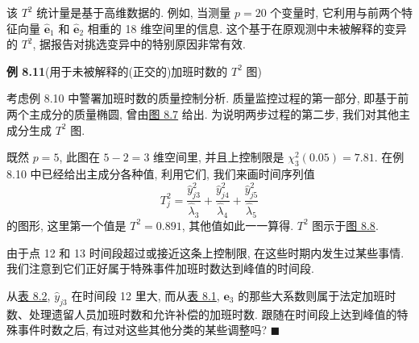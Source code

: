 该 $T^2$ 统计量是基于高维数据的. 例如, 当测量 $p=20$ 个变量时, 它利用与前两个特征向量 $\hat{\mathbf{e}}_1$ 和 $\hat{\mathbf{e}}_2$ 相重的 18 维空间里的信息. 这个基于在原观测中未被解释的变异的 $T^2$, 据报告对挑选变异中的特别原因非常有效.

\noindent\textbf{例 8.11}\quad (用于未被解释的(正交的)加班时数的 $T^2$ 图)

考虑例 8.10 中警署加班时数的质量控制分析. 质量监控过程的第一部分, 即基于前两个主成分的质量椭圆, 曾由\hyperref[fig:8.7]{图 8.7} 给出. 为说明两步过程的第二步, 我们对其他主成分生成 $T^2$ 图.

既然 $p=5$, 此图在 $5-2=3$ 维空间里, 并且上控制限是 $\chi_3^2(0.05)=7.81$. 在例 8.10 中已经给出主成分各种值, 利用它们, 我们来画时间序列值
\[
T_j^2=\frac{\hat{y}_{j3}^2}{\hat{\lambda}_3}+\frac{\hat{y}_{j4}^2}{\hat{\lambda}_4}+\frac{\hat{y}_{j5}^2}{\hat{\lambda}_5}
\]
的图形, 这里第一个值是 $T^2=0.891$, 其他值如此一一算得. $T^2$ 图示于\hyperref[fig:8.8]{图 8.8}.

由于点 12 和 13 时间段超过或接近这条上控制限, 在这些时期内发生过某些事情. 我们注意到它们正好属于特殊事件加班时数达到峰值的时间段.

从\hyperref[tab:8.2]{表 8.2}, $\hat{y}_{j3}$ 在时间段 12 里大, 而从\hyperref[tab:8.1]{表 8.1}, $\mathbf{e}_3$ 的那些大系数则属于法定加班时数、处理遗留人员加班时数和允许补偿的加班时数. 跟随在时间段上达到峰值的特殊事件时数之后, 有过对这些其他分类的某些调整吗? \hfill$\blacksquare$
